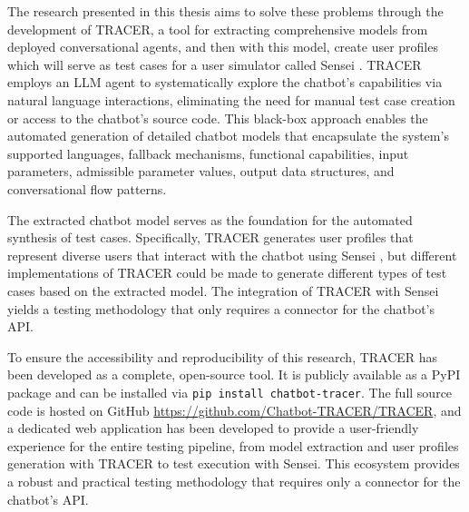 The research presented in this thesis aims to solve these problems through the development of \ac{TRACER},
a tool for extracting comprehensive models from deployed conversational agents,
and then with this model, create user profiles which will serve as test cases
for a user simulator called Sensei \autocite{delaraSensei}.
\ac{TRACER} employs an \ac{LLM} agent to systematically explore the chatbot's capabilities via natural language interactions,
eliminating the need for manual test case creation or access to the chatbot's source code.
This black-box approach enables the automated generation of detailed chatbot models that encapsulate
the system's supported languages, fallback mechanisms, functional capabilities, input parameters, admissible parameter values, output data structures, and conversational flow patterns.

The extracted chatbot model serves as the foundation for the automated synthesis of test cases.
Specifically, \ac{TRACER} generates user profiles that represent diverse users that interact with the chatbot using Sensei \autocite{delaraSensei},
but different implementations of \ac{TRACER} could be made to generate different types of test cases based on the extracted model.
The integration of \ac{TRACER} with Sensei yields a testing methodology that only requires a connector for the chatbot's API.


To ensure the accessibility and reproducibility of this research,
\ac{TRACER} has been developed as a complete, open-source tool.
It is publicly available as a \ac{PyPI} package \autocite{sotillodelhornoChatbottracerToolModel}
and can be installed via \texttt{pip install chatbot-tracer}.
The full source code is hosted on GitHub \href{https://github.com/Chatbot-TRACER/TRACER}{https://github.com/Chatbot-TRACER/TRACER},
and a dedicated web application %
has been developed to provide a user-friendly experience for the entire testing pipeline,
from model extraction and user profiles generation with \ac{TRACER} to test execution with Sensei.
This ecosystem provides a robust and practical testing methodology that requires only a connector for the chatbot's API.

